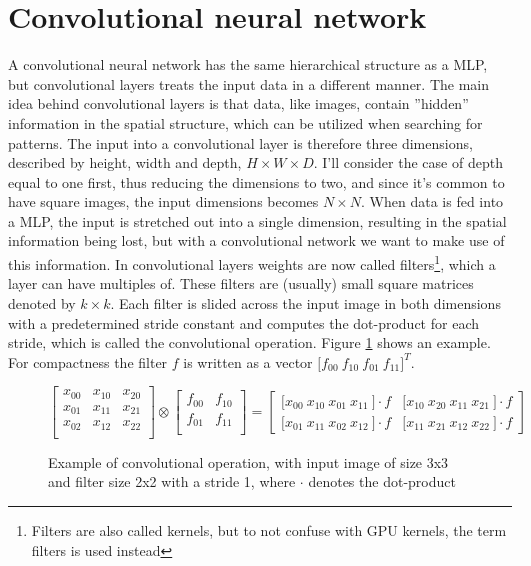 \section{Convolutional neural network}
A convolutional neural network has the same hierarchical structure as a MLP, but
convolutional layers treats the input data in a different manner. The main idea
behind convolutional layers is that data, like images, contain ''hidden''
information in the spatial structure, which can be utilized when searching for
patterns. The input into a convolutional layer is therefore three dimensions,
described by height, width and depth, $H \times W \times D$. I'll consider the
case of depth equal to one first, thus reducing the dimensions to two, and since
it's common to have square images, the input dimensions becomes $N \times N$.
When data is fed into a MLP, the input is stretched out into a single dimension,
resulting in the spatial information being lost, but with a convolutional
network we want to make use of this information. In convolutional layers weights
are now called filters\footnote{Filters are also called kernels, but to not
	confuse with GPU kernels, the term filters is used instead}, which a layer can
have multiples of. These filters are (usually) small square matrices denoted by
$k \times k$. Each filter is slided across the input image in both dimensions
with a predetermined stride constant and computes the dot-product for each
stride, which is called the convolutional operation. Figure \ref{fig:cross}
shows an example. For compactness the filter $f$ is written as a vector $\lbrack
f_{00}\ f_{10} \ f_{01} \ f_{11} \rbrack^T $.
\begin{figure}[!hbtp]
	\begin{displaymath}
	\begin{bmatrix}
	x_{00} & x_{10} & x_{20}  \\ 
	x_{01} & x_{11} & x_{21}  \\ 
	x_{02} & x_{12} & x_{22}  \\ 
	\end{bmatrix}
	\otimes
	\begin{bmatrix}
	f_{00} & f_{10} \\ 
	f_{01} & f_{11}  \\  
	\end{bmatrix}	
	= 
	\begin{bmatrix}
	\lbrack x_{00} \  x_{10}\  x_{01} \  x_{11} \ \rbrack \cdot  f   & \lbrack
	x_{10} \  x_{20}\  x_{11} \  x_{21} \ \rbrack \cdot f \\ 
	\lbrack x_{01} \  x_{11}\  x_{02} \  x_{12} \ \rbrack \cdot f & \lbrack x_{11}
	\  x_{21}\  x_{12} \  x_{22} \ \rbrack \cdot f  
	\end{bmatrix}
	\end{displaymath}
	\caption{Example of convolutional operation, with input image of size 3x3 and
		filter size 2x2 with a stride 1, where $\cdot$ denotes the dot-product}
	\label{fig:cross}
\end{figure} \newline 
